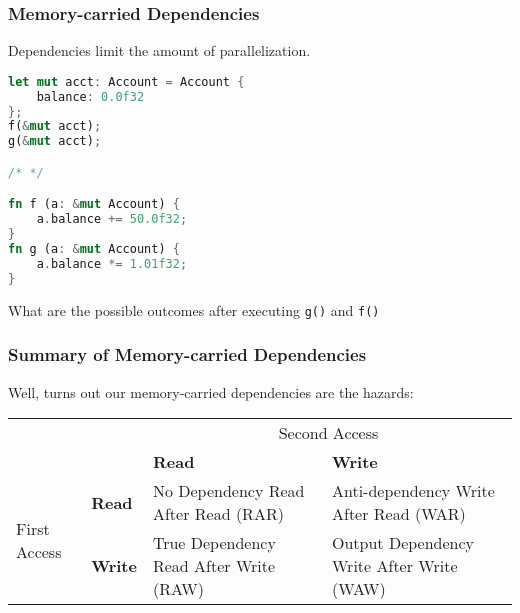\begin{frame}[fragile]
\frametitle{Memory-carried Dependencies}

Dependencies limit the amount of parallelization.

\begin{lstlisting}[language=Rust]
let mut acct: Account = Account {
    balance: 0.0f32
};
f(&mut acct);
g(&mut acct);

/* */

fn f (a: &mut Account) {
    a.balance += 50.0f32;
}
fn g (a: &mut Account) {
    a.balance *= 1.01f32;
}
\end{lstlisting}

What are the possible outcomes after executing {\tt g()} and {\tt f()}


\end{frame}







\begin{frame}
\frametitle{Summary of Memory-carried Dependencies}

Well, turns out our memory-carried dependencies are the hazards:
\begin{center}
\begin{tabular}{ll|p{2.8cm}p{3.2cm}}
& & \multicolumn{2}{c}{Second Access} \\ 
&  & \bf Read & \bf Write \\ \hline
\multirow{2}{*}{First Access} & \bf Read & No Dependency Read After Read (RAR)  & Anti-dependency Write After Read (WAR) \\[0.5em]
& \bf Write & True Dependency Read After Write (RAW) & Output Dependency Write After Write (WAW) \\
\end{tabular}
\end{center}
\end{frame}



